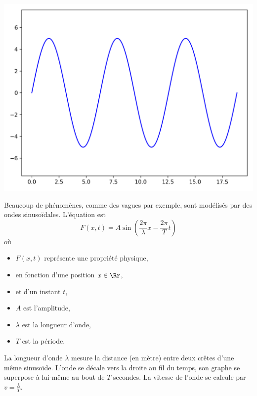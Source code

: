 \documentclass[11pt,class=report,crop=false]{standalone}
\begin{document}
\begin{center}
	\includegraphics[scale=\myscale,scale=0.5]{figures/ondes1D-1}
\end{center}

Beaucoup de phénomènes, comme des vagues par exemple, sont modélisés par des ondes sinusoïdales. L'équation est 
$$F(x,t) = A \sin\left(\frac{2\pi}{\lambda} x -  \frac{2\pi}{T} t\right)$$
où 
\begin{itemize}
	\item $F(x,t)$ représente une propriété physique,
	\item en fonction d'une position $x\in\Rr$,
	\item et d'un instant $t$,
	\item $A$ est l'amplitude,
	\item $\lambda$ est la longueur d'onde,
	\item $T$ est la période.
\end{itemize}

La longueur d'onde $\lambda$ mesure la distance (en mètre) entre deux crêtes d'une même sinusoïde. 
L'onde se décale vers la droite au fil du temps, son graphe se superpose à lui-même au bout de $T$ secondes.
La vitesse de l'onde se calcule par $v = \frac{\lambda}{T}$. 
\end{document}
